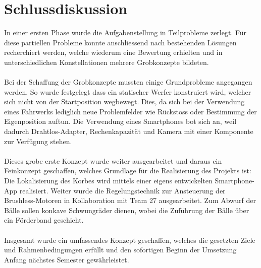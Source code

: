 \section{Schlussdiskussion}
In einer ersten Phase wurde die Aufgabenstellung in Teilprobleme zerlegt. Für diese partiellen Probleme konnte anschliessend nach bestehenden Lösungen recherchiert werden, welche wiederum eine Bewertung erhielten und in unterschiedlichen Konstellationen mehrere Grobkonzepte bildeten. \\
\\
Bei der Schaffung der Grobkonzepte mussten einige Grundprobleme angegangen werden. So wurde festgelegt dass ein statischer Werfer konstruiert wird, welcher sich nicht von der Startposition wegbewegt. Dies, da sich bei der Verwendung eines Fahrwerks lediglich neue Problemfelder wie Rückstoss oder Bestimmung der Eigenposition auftun. Die Verwendung eines Smartphones bot sich an, weil dadurch Drahtlos-Adapter, Rechenkapazität und Kamera mit einer Komponente zur Verfügung stehen. \\
\\
Dieses grobe erste Konzept wurde weiter ausgearbeitet und daraus ein Feinkonzept geschaffen, welches Grundlage für die Realisierung des Projekts ist: Die Lokalisierung des Korbes wird mittels einer eigens entwickelten Smartphone-App realisiert. Weiter wurde die Regelungstechnik zur Ansteuerung der Brushless-Motoren in Kollaboration mit Team 27 ausgearbeitet. Zum Abwurf der Bälle sollen konkave Schwungräder dienen, wobei die Zuführung der Bälle über ein Förderband geschieht. \\
\\
Insgesamt wurde ein umfassendes Konzept geschaffen, welches die gesetzten Ziele und Rahmenbedingungen erfüllt und den sofortigen Beginn der Umsetzung Anfang nächstes Semester gewährleistet.